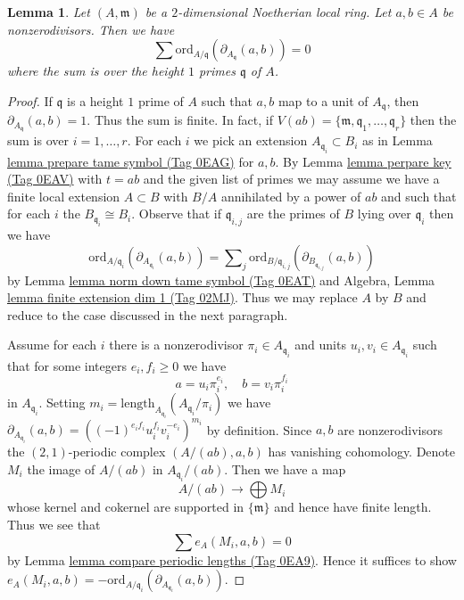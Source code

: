 \documentclass{amsart}
\theoremstyle{plain}
\newtheorem{lemma}[subsection]{Lemma}
\theoremstyle{definition}
\theoremstyle{remark}
\numberwithin{equation}{subsection}
\begin{document}
\begin{lemma}
\label{lemma-key-nonzerodivisors}
Let $(A, \mathfrak m)$ be a $2$-dimensional Noetherian local ring.
Let $a, b \in A$ be nonzerodivisors.
Then we have
$$
\sum
\text{ord}_{A/\mathfrak q}(\partial_{A_{\mathfrak q}}(a, b))
=
0
$$
where the sum is over the height $1$ primes $\mathfrak q$ of $A$.
\end{lemma}

\begin{proof}
If $\mathfrak q$ is a height $1$ prime of $A$ such that $a, b$
map to a unit of $A_\mathfrak q$, then $\partial_{A_\mathfrak q}(a, b) = 1$.
Thus the sum is finite. In fact, if
$V(ab) = \{\mathfrak m, \mathfrak q_1, \ldots, \mathfrak q_r\}$
then the sum is over $i = 1, \ldots, r$.
For each $i$ we pick an extension $A_{\mathfrak q_i} \subset B_i$
as in Lemma \href{https://stacks.math.columbia.edu/tag/0EAG}{lemma prepare tame symbol (Tag 0EAG)} for $a, b$.
By Lemma \href{https://stacks.math.columbia.edu/tag/0EAV}{lemma perpare key (Tag 0EAV)} with $t = ab$ and the given list of primes
we may assume we have a finite local extension $A \subset B$
with $B/A$ annihilated by a power of $ab$ and such that
for each $i$ the $B_{\mathfrak q_i} \cong B_i$.
Observe that if $\mathfrak q_{i, j}$ are the primes of $B$
lying over $\mathfrak q_i$ then we have
$$
\text{ord}_{A/\mathfrak q_i}(\partial_{A_{\mathfrak q_i}}(a, b))
=
\sum\nolimits_j
\text{ord}_{B/\mathfrak q_{i, j}}(\partial_{B_{\mathfrak q_{i, j}}}(a, b))
$$
by Lemma \href{https://stacks.math.columbia.edu/tag/0EAT}{lemma norm down tame symbol (Tag 0EAT)} and
Algebra, Lemma \href{https://stacks.math.columbia.edu/tag/02MJ}{lemma finite extension dim 1 (Tag 02MJ)}.
Thus we may replace $A$ by $B$ and
reduce to the case discussed in the next paragraph.

\medskip\noindent
Assume for each $i$ there is a nonzerodivisor
$\pi_i \in A_{\mathfrak q_i}$ and units $u_i, v_i \in A_{\mathfrak q_i}$
such that for some integers $e_i, f_i \geq 0$ we have
$$
a = u_i \pi_i^{e_i},\quad b = v_i \pi_i^{f_i}
$$
in $A_{\mathfrak q_i}$. Setting
$m_i = \text{length}_{A_{\mathfrak q_i}}(A_{\mathfrak q_i}/\pi_i)$
we have
$\partial_{A_{\mathfrak q_i}}(a, b) =
((-1)^{e_if_i}u_i^{f_i}v_i^{-e_i})^{m_i}$ by definition.
Since $a, b$ are nonzerodivisors the
$(2, 1)$-periodic complex $(A/(ab), a, b)$ has vanishing cohomology.
Denote $M_i$ the image of $A/(ab)$ in $A_{\mathfrak q_i}/(ab)$.
Then we have a map
$$
A/(ab) \longrightarrow \bigoplus M_i
$$
whose kernel and cokernel are supported in $\{\mathfrak m\}$
and hence have finite length. Thus we see that
$$
\sum e_A(M_i, a, b) = 0
$$
by Lemma \href{https://stacks.math.columbia.edu/tag/0EA9}{lemma compare periodic lengths (Tag 0EA9)}. Hence it suffices to show
$e_A(M_i, a, b) =
- \text{ord}_{A/\mathfrak q_i}(\partial_{A_{\mathfrak q_i}}(a, b))$.


\end{proof}
\end{document}
